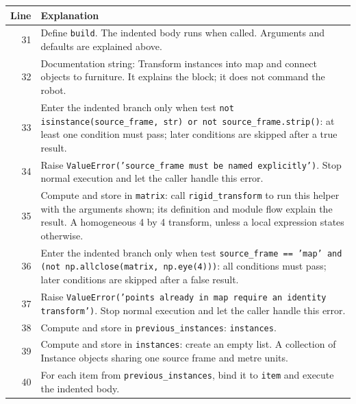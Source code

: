 \documentclass[11pt,a4paper]{book}
\begin{document}
\begin{longtable}{r p{}}

\textbf{Line} & \textbf{Explanation} \\ \hline \endhead

31 & Define \texttt{build}. The indented body runs when called. Arguments and defaults are explained above. \\

32 & Documentation string: Transform instances into map and connect objects to furniture. It explains the block; it does not command the robot. \\

33 & Enter the indented branch only when test \texttt{not isinstance(source\_frame, str) or not source\_frame.strip()}: at least one condition must pass; later conditions are skipped after a true result. \\

34 & Raise \texttt{ValueError('source\_frame must be named explicitly')}. Stop normal execution and let the caller handle this error. \\

35 & Compute and store in \texttt{matrix}: call \texttt{rigid\_transform} to run this helper with the arguments shown; its definition and module flow explain the result. A homogeneous 4 by 4 transform, unless a local expression states otherwise. \\

36 & Enter the indented branch only when test \texttt{source\_frame == 'map' and (not np.allclose(matrix, np.eye(4)))}: all conditions must pass; later conditions are skipped after a false result. \\

37 & Raise \texttt{ValueError('points already in map require an identity transform')}. Stop normal execution and let the caller handle this error. \\

38 & Compute and store in \texttt{previous\_instances}: \texttt{instances}.  \\

39 & Compute and store in \texttt{instances}: create an empty list. A collection of Instance objects sharing one source frame and metre units. \\

40 & For each item from \texttt{previous\_instances}, bind it to \texttt{item} and execute the indented body. \\


\end{longtable}
\end{document}
